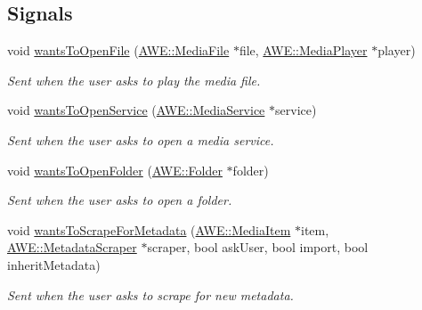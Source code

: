\subsection*{Signals}
\begin{DoxyCompactItemize}
\item 
void \hyperlink{class_u_i_1_1_info_pane_a22ba3a66c0aed80549cc316d60a57a91}{wants\-To\-Open\-File} (\hyperlink{class_a_w_e_1_1_media_file}{A\-W\-E\-::\-Media\-File} $\ast$file, \hyperlink{class_a_w_e_1_1_media_player}{A\-W\-E\-::\-Media\-Player} $\ast$player)
\begin{DoxyCompactList}\small\item\em Sent when the user asks to play the media file. \end{DoxyCompactList}\item 
void \hyperlink{class_u_i_1_1_info_pane_a9f60b17b07327328ebb91ebb77ccd291}{wants\-To\-Open\-Service} (\hyperlink{class_a_w_e_1_1_media_service}{A\-W\-E\-::\-Media\-Service} $\ast$service)
\begin{DoxyCompactList}\small\item\em Sent when the user asks to open a media service. \end{DoxyCompactList}\item 
void \hyperlink{class_u_i_1_1_info_pane_a07fad336c381e80b5c49e59bddb14f00}{wants\-To\-Open\-Folder} (\hyperlink{class_a_w_e_1_1_folder}{A\-W\-E\-::\-Folder} $\ast$folder)
\begin{DoxyCompactList}\small\item\em Sent when the user asks to open a folder. \end{DoxyCompactList}\item 
void \hyperlink{class_u_i_1_1_info_pane_a658214286f29f974061b71595f3f2b46}{wants\-To\-Scrape\-For\-Metadata} (\hyperlink{class_a_w_e_1_1_media_item}{A\-W\-E\-::\-Media\-Item} $\ast$item, \hyperlink{class_a_w_e_1_1_metadata_scraper}{A\-W\-E\-::\-Metadata\-Scraper} $\ast$scraper, bool ask\-User, bool import, bool inherit\-Metadata)
\begin{DoxyCompactList}\small\item\em Sent when the user asks to scrape for new metadata. \end{DoxyCompactList}\end{DoxyCompactItemize}
